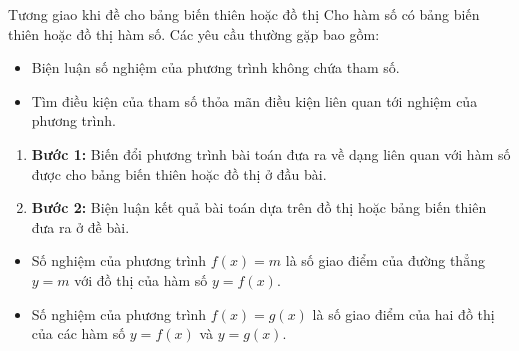 \begin{dang}{Tương giao khi đề cho bảng biến thiên hoặc đồ thị}
    \baitoan Cho hàm số có bảng biến thiên hoặc đồ thị hàm số. Các yêu cầu thường gặp bao gồm:
    \begin{itemize}
        \item Biện luận số nghiệm của phương trình không chứa tham số.
        \item Tìm điều kiện của tham số thỏa mãn điều kiện liên quan tới nghiệm của phương trình.
    \end{itemize}
    \phuongphap
    \begin{enumerate}
        \item[] {\bf Bước 1:} Biến đổi phương trình bài toán đưa ra về dạng liên quan với hàm số được cho bảng biến thiên hoặc đồ thị ở đầu bài.
        \item[] {\bf Bước 2:} Biện luận kết quả bài toán dựa trên đồ thị hoặc bảng biến thiên đưa ra ở đề bài.
    \end{enumerate}
    \begin{luuy}
        \begin{itemize}
            \item Số nghiệm của phương trình $f(x)=m$ là số giao điểm của đường thẳng $y=m$ với đồ thị của hàm số $y=f(x)$.
            \item Số nghiệm của phương trình $f(x)=g(x)$ là số giao điểm của hai đồ thị của các hàm số $y=f(x)$ và $y=g(x)$.
        \end{itemize}
    \end{luuy}
\end{dang}
